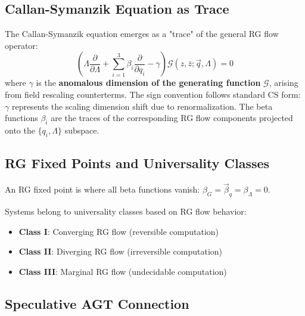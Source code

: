 \subsection{Callan-Symanzik Equation as Trace}

\begin{theorem}
\label{thm:callan-symanzik-trace}
The Callan-Symanzik equation emerges as a "trace" of the general RG flow operator:
\[
\left(\Lambda \frac{\partial}{\partial \Lambda} + \sum_{i=1}^3 \beta_i \frac{\partial}{\partial q_i} - \gamma\right) \mathcal{G}(z, \bar{z}; \vec{q}, \Lambda) = 0
\]
where $\gamma$ is the \textbf{anomalous dimension of the generating function} $\mathcal{G}$, arising from field rescaling counterterms. The sign convention follows standard CS form: $\gamma$ represents the scaling dimension shift due to renormalization. The beta functions $\beta_i$ are the traces of the corresponding RG flow components projected onto the $\{q_i, \Lambda\}$ subspace.
\end{theorem}

\subsection{RG Fixed Points and Universality Classes}

\begin{definition}
\label{def:rg-fixed-points}
An RG fixed point is where all beta functions vanish: $\beta_G = \vec{\beta}_q = \beta_\Lambda = 0$.
\end{definition}

\begin{definition}
\label{def:computational-universality}
Systems belong to universality classes based on RG flow behavior:
\begin{itemize}
\item \textbf{Class I}: Converging RG flow (reversible computation)
\item \textbf{Class II}: Diverging RG flow (irreversible computation)  
\item \textbf{Class III}: Marginal RG flow (undecidable computation)
\end{itemize}
\end{definition}

\subsection{Speculative AGT Connection}

